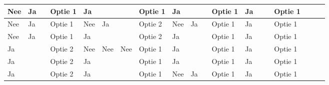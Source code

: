 \documentclass[twoside,openright]{uva-bachelor-thesis}
\begin{document}
\begin{table}
\begin{tabular}{|l|l|l|l|l|l|l|l|l|l|l|l|l|l|l|l|l|l|l|}
		Nee      & Ja       &          & Optie 1                             & Ja       &          &          & Optie 1                             & Ja       &          &          & Optie 1                             & Ja       &          &          & Optie 1                             &                    &                    &                                                          \\  \hline
		Nee      & Ja       &          & Optie 1                             & Nee      & Ja       &          & Optie 2                             & Nee      & Ja       &          & Optie 1                             & Ja       &          &          & Optie 1                             &                    &                    &                                                          \\  \hline
		Nee      & Ja       &          & Optie 1                             & Ja       &          &          & Optie 2                             & Ja       &          &          & Optie 1                             & Ja       &          &          & Optie 1                             &                    &                    &                                                          \\  \hline
		Ja       &          &          & Optie 2                             & Nee      & Nee      & Nee      & Optie 1                             & Ja       &          &          & Optie 1                             & Ja       &          &          & Optie 1                             &                    &                    &                                                          \\  \hline
		Ja       &          &          & Optie 2                             & Ja       &          &          & Optie 1                             & Ja       &          &          & Optie 1                             & Ja       &          &          & Optie 1                             &                    &                    &                                                          \\  \hline
		Ja       &          &          & Optie 2                             & Ja       &          &          & Optie 1                             & Nee      & Ja       &          & Optie 1                             & Ja       &          &          & Optie 1                             &                    &                    &                                                          \\  \hline

\end{tabular}
\end{table}
\end{document}
